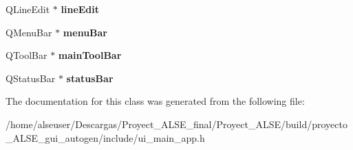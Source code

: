 \begin{DoxyCompactItemize}
\mbox{\label{class_ui__main__app_ae5e774947efb468db8c66b36d0bc22c8}} 
Q\+Line\+Edit $\ast$ {\bfseries line\+Edit}
\item 
\mbox{\label{class_ui__main__app_a7f8aa699e38eab18549932caab4992c7}} 
Q\+Menu\+Bar $\ast$ {\bfseries menu\+Bar}
\item 
\mbox{\label{class_ui__main__app_a9e56f426088a781f6a01dc11e110668f}} 
Q\+Tool\+Bar $\ast$ {\bfseries main\+Tool\+Bar}
\item 
\mbox{\label{class_ui__main__app_a00d5194852ac5f91f61b26f9d99f688e}} 
Q\+Status\+Bar $\ast$ {\bfseries status\+Bar}
\end{DoxyCompactItemize}


The documentation for this class was generated from the following file\+:\begin{DoxyCompactItemize}
\item 
/home/alseuser/\+Descargas/\+Proyect\+\_\+\+A\+L\+S\+E\+\_\+final/\+Proyect\+\_\+\+A\+L\+S\+E/build/proyecto\+\_\+\+A\+L\+S\+E\+\_\+gui\+\_\+autogen/include/ui\+\_\+main\+\_\+app.\+h\end{DoxyCompactItemize}
